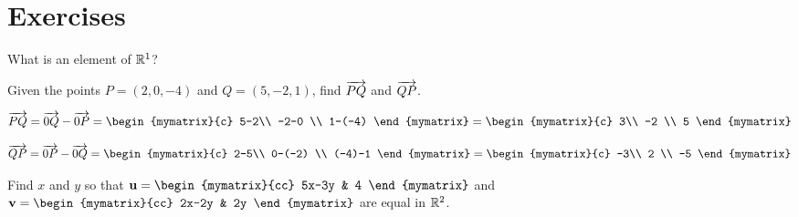 \section*{Exercises}

\begin{enumialphparenastyle}

\begin{ex}
  What is an element of $\mathbb{R}^1$? 
\end{ex}

\begin{ex} Given the points $P=(2,0,-4)$ and $Q=(5,-2,1)$, find $\overrightarrow{PQ}$ and $\overrightarrow{QP}$.
 
\begin{sol}

\begin{equation*}
\longvect{PQ}  = \longvect{0Q} - \longvect{0P}= \begin{mymatrix}{c}
5-2\\
 -2-0 \\
1-(-4)
\end{mymatrix} = \begin{mymatrix}{c}
3\\
 -2 \\
5
\end{mymatrix}
\end{equation*}

\begin{equation*}
\longvect{QP}  = \longvect{0P} - \longvect{0Q}= \begin{mymatrix}{c}
2-5\\
 0-(-2) \\
(-4)-1
\end{mymatrix} = \begin{mymatrix}{c}
-3\\
 2 \\
-5
\end{mymatrix}
\end{equation*}

\end{sol}
\end{ex}

\begin{ex} Find $x$ and $y$ so that $\vect{u}= \begin{mymatrix}{cc}
5x-3y & 4
\end{mymatrix}$ and $\vect{v}= \begin{mymatrix}{cc}
2x-2y & 2y
\end{mymatrix}$ are equal in $\mathbb{R}^2$.
 

\end{ex}
\end{enumialphparenastyle}
